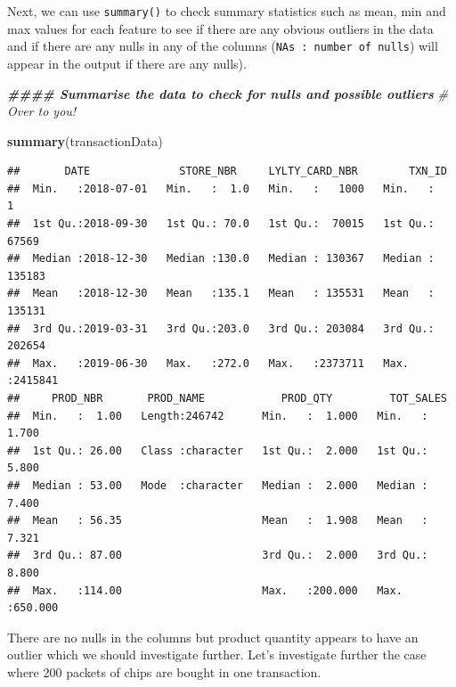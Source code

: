 \documentclass[
]{article}
\newenvironment{Shaded}{\begin{snugshade}}{\end{snugshade}}
\newcommand{\CommentTok}[1]{\textcolor[rgb]{0.56,0.35,0.01}{\textit{#1}}}
\newcommand{\DocumentationTok}[1]{\textcolor[rgb]{0.56,0.35,0.01}{\textbf{\textit{#1}}}}
\newcommand{\FloatTok}[1]{\textcolor[rgb]{0.00,0.00,0.81}{#1}}
\newcommand{\FunctionTok}[1]{\textcolor[rgb]{0.13,0.29,0.53}{\textbf{#1}}}
\newcommand{\NormalTok}[1]{#1}
\newcommand{\SpecialCharTok}[1]{\textcolor[rgb]{0.81,0.36,0.00}{\textbf{#1}}}
\begin{document}
Next, we can use \texttt{summary()} to check summary statistics such as
mean, min and max values for each feature to see if there are any
obvious outliers in the data and if there are any nulls in any of the
columns (\texttt{NA\textquotesingle{}s\ :\ number\ of\ nulls}) will
appear in the output if there are any nulls).

\begin{Shaded}
\begin{Highlighting}[]
\DocumentationTok{\#\#\#\# Summarise the data to check for nulls and possible outliers}
\CommentTok{\# Over to you!}

\FunctionTok{summary}\NormalTok{(transactionData)}
\end{Highlighting}
\end{Shaded}

\begin{verbatim}
##       DATE              STORE_NBR     LYLTY_CARD_NBR        TXN_ID       
##  Min.   :2018-07-01   Min.   :  1.0   Min.   :   1000   Min.   :      1  
##  1st Qu.:2018-09-30   1st Qu.: 70.0   1st Qu.:  70015   1st Qu.:  67569  
##  Median :2018-12-30   Median :130.0   Median : 130367   Median : 135183  
##  Mean   :2018-12-30   Mean   :135.1   Mean   : 135531   Mean   : 135131  
##  3rd Qu.:2019-03-31   3rd Qu.:203.0   3rd Qu.: 203084   3rd Qu.: 202654  
##  Max.   :2019-06-30   Max.   :272.0   Max.   :2373711   Max.   :2415841  
##     PROD_NBR       PROD_NAME            PROD_QTY         TOT_SALES      
##  Min.   :  1.00   Length:246742      Min.   :  1.000   Min.   :  1.700  
##  1st Qu.: 26.00   Class :character   1st Qu.:  2.000   1st Qu.:  5.800  
##  Median : 53.00   Mode  :character   Median :  2.000   Median :  7.400  
##  Mean   : 56.35                      Mean   :  1.908   Mean   :  7.321  
##  3rd Qu.: 87.00                      3rd Qu.:  2.000   3rd Qu.:  8.800  
##  Max.   :114.00                      Max.   :200.000   Max.   :650.000
\end{verbatim}

There are no nulls in the columns but product quantity appears to have
an outlier which we should investigate further. Let's investigate
further the case where 200 packets of chips are bought in one
transaction.

\begin{Shaded}
\end{Shaded}
\end{document}
